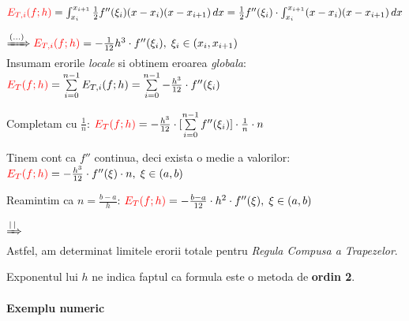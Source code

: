 \documentclass{article}
\begin{document}
$\textcolor{red}{E_{T,i}(f;h)} = \int_{x_i}^{x_{i+1}} \frac{1}{2} f''(\xi_i) (x-x_i) (x-x_{i+1})\, dx = \frac{1}{2} f''(\xi_i) \cdot \int_{x_i}^{x_{i+1}} (x-x_i) (x-x_{i+1})\, dx$

$\xRightarrow[]{(...)} \textcolor{red}{E_{T,i}(f;h)} = -\frac{1}{12} h^3 \cdot f''(\xi_i),\; \xi_i \in (x_i, x_{i+1})$ \\

Insumam erorile \textit{locale} si obtinem eroarea \textit{globala}:
$\textcolor{red}{E_T(f;h)} = \sum\limits_{i=0}^{n-1} E_{T,i}(f;h) = \sum\limits_{i=0}^{n-1} -\frac{h^3}{12} \cdot f''(\xi_i)$

Completam cu $\frac{1}{n}$:
$\textcolor{red}{E_T(f;h)} = -\frac{h^3}{12} \cdot [\sum\limits_{i=0}^{n-1} f''(\xi_i)] \cdot \frac{1}{n} \cdot n$

Tinem cont ca $f''$ continua, deci exista o medie a valorilor:
$\textcolor{red}{E_T(f;h)} = -\frac{h^3}{12} \cdot f''(\xi) \cdot n,\; \xi \in (a,b)$\vspace{0.2cm}

Reamintim ca $n = \frac{b-a}{h}$:
$\textcolor{red}{E_T(f;h)} = -\frac{b-a}{12} \cdot h^2 \cdot f''(\xi), \; \xi \in (a,b)$

$\xRightarrow[]{|\,|}$  \\

Astfel, am determinat limitele erorii totale pentru \textit{Regula Compusa a Trapezelor}.

Exponentul lui $h$ ne indica faptul ca formula este o metoda de \textbf{ordin 2}.


\paragraph{Exemplu numeric}
\end{document}
